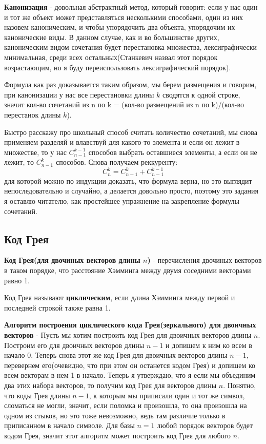 \textbf{Канонизация} - довольная абстрактный метод, который говорит: если у нас один и тот же объект может представляться несколькими способами, один из них назовем каноническим, и чтобы упорядочить два объекта, упорядочим их канонические виды. В данном случае, как и во большинстве других, каноническим видом сочетания будет перестановка множества, лексиграфически минимальная, среди всех остальных(Станкевич назвал этот порядок возрастающим, но я буду переиспользовать лексиграфический порядок).

Формула как раз доказывается таким образом, мы берем размещения и говорим, при канонизации у нас все перестановки длины $k$ сводятся к одной строке, значит кол-во сочетаний из n по k = (кол-во размещений из n по k)/(кол-во перестанок длины $k$).

Быстро расскажу про школьный способ считать количество сочетаний, мы снова применяем разделяй и влавствуй для какого-то элемента и если он лежит в множестве, то у нас $C_{n-1}^{k-1}$ способов выбрать оставшиеся элементы, а если он не лежит, то $C_{n - 1}^k$ способов. Снова получаем реккуренту: $$C_n^k=C_{n-1}^k+C_{n-1}^{k-1}$$ для которой можно по индукции доказать, что формула верна, но это выглядит непоследовательно и случайно, а делается довольно просто, поэтому это задания я оставлю читателю, как простейшее упражнение на закрепление формулы сочетаний.

\subsection{Код Грея}
\textbf{Код Грея(для двочиных векторов длины $n$)} - перечисления двочиных векторов в таком порядке, что расстояние Хэмминга между двумя соседними векторами равно 1.

Код Грея называют \textbf{циклическим}, если длина Хэмминга между первой и последней строкой также равна 1.

\textbf{Алгоритм построения циклического кода Грея(зеркального) для двоичных векторов} - Пусть мы хотим построить код Грея для двоичных векторов длины $n$. Построим его для двоичных векторов длины $n-1$ и допишем к ним ко всем в начало 0. Теперь снова этот же код Грея для двоичных векторов длины $n-1$, перевернем его(очевидно, что при этом он останется кодом Грея) и допишем ко всем векторам в нем 1 в начало. Теперь я утверждаю, что я если мы объединим два этих набора векторов, то получим код Грея для векторов длины $n$. Понятно, что коды Грея длины $n-1$, к которым мы приписали один и тот же символ, сломаться не могли, значит, если поломка и произошла, то она произошла на одном из стыков, но это тоже невозможно, ведь там различие только в приписанном в начало символе. Для базы $n=1$ любой порядок векторов будет кодом Грея, значит этот алгоритм может построить код Грея для любого $n$.

